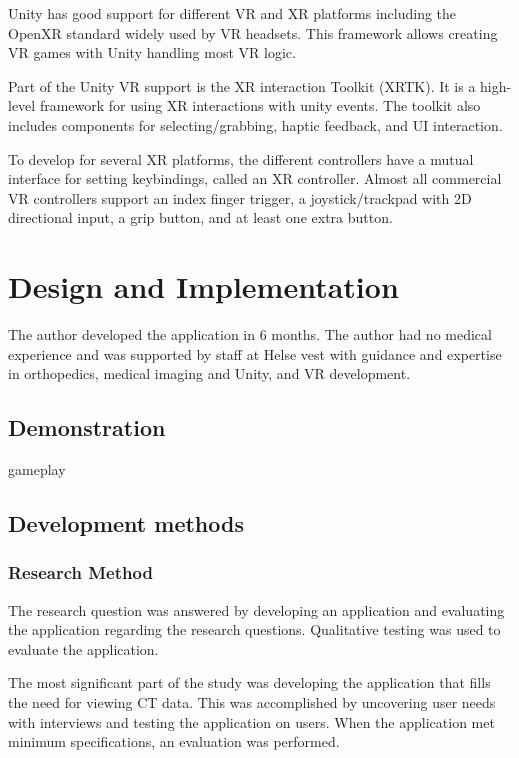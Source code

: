 \documentclass[a4paper]{report}
\begin{document}
Unity has good support for different VR and XR platforms\cite{technologies_unity_nodate-3} including the OpenXR standard widely used by VR headsets\cite{noauthor_openxr_2016}. This framework allows creating VR games with Unity handling most VR logic.

Part of the Unity VR support is the XR interaction Toolkit (XRTK)\cite{noauthor_xr_nodate}. It is a high-level framework for using XR interactions with unity events. The toolkit also includes components for selecting/grabbing, haptic feedback, and UI interaction.

To develop for several XR platforms, the different controllers have a mutual interface for setting keybindings, called an XR controller. Almost all commercial VR controllers support an index finger trigger, a joystick/trackpad with 2D directional input, a grip button, and at least one extra button\cite{technologies_unity_nodate}.


\chapter{Design and Implementation}\label{Design and Implementation}
The author developed the application in 6 months. The author had no medical experience and was supported by staff at Helse vest with guidance and expertise in orthopedics, medical imaging and Unity, and VR development.

\section{Demonstration}\label{demonstration}
gameplay

\section{Development methods}

\subsection{Research Method}
The research question was answered by developing an application and evaluating the application regarding the research questions. Qualitative testing was used to evaluate the application.

The most significant part of the study was developing the application that fills the need for viewing CT data. This was accomplished by uncovering user needs with interviews and testing the application on users. When the application met minimum specifications, an evaluation was performed. 
\end{document}
